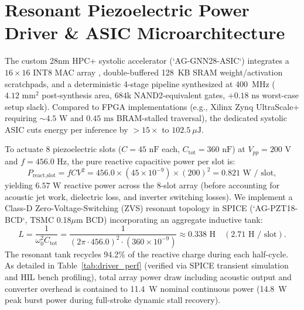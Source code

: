 \documentclass[journal,10pt,twocolumn]{IEEEtran}
\begin{document}
\section{Resonant Piezoelectric Power Driver \& ASIC Microarchitecture}
The custom 28nm HPC+ systolic accelerator (`AG-GNN28-ASIC`) \cite{dixit2025aeroguard} integrates a $16 \times 16$ INT8 MAC array \cite{jouppi2017datacenter,chen2016eyeriss}, double-buffered 128~KB SRAM weight/activation scratchpads, and a deterministic 4-stage pipeline synthesized at 400~MHz ($4.12\text{ mm}^2$ post-synthesis area, $684\text{k}$ NAND2-equivalent gates, $+0.18\text{ ns}$ worst-case setup slack). Compared to FPGA implementations (e.g., Xilinx Zynq UltraScale+ requiring $\sim 4.5\text{ W}$ and $0.45\text{ ms}$ BRAM-stalled traversal), the dedicated systolic ASIC cuts energy per inference by $>15\times$ to $102.5\ \mu\text{J}$.

To actuate 8 piezoelectric slots \cite{cattafesta2011actuators} ($C = 45\text{ nF}$ each, $C_{\text{tot}} = 360\text{ nF}$) at $V_{pp} = 200\text{ V}$ and $f = 456.0\text{ Hz}$, the pure reactive capacitive power per slot is:
\begin{equation}
P_{\text{react,slot}} = f C V^2 = 456.0 \times (45 \times 10^{-9}) \times (200)^2 = 0.821\text{ W / slot},
\end{equation}
yielding $6.57\text{ W}$ reactive power across the 8-slot array (before accounting for acoustic jet work, dielectric loss, and inverter switching losses). We implement a Class-D Zero-Voltage-Switching (ZVS) resonant topology \cite{erickson2007fundamentals} in SPICE (`AG-PZT18-BCD`, TSMC 0.18$\mu$m BCD) incorporating an aggregate inductive tank:
\begin{equation}
L = \frac{1}{\omega_0^2 C_{\text{tot}}} = \frac{1}{(2\pi \cdot 456.0)^2 \cdot (360 \times 10^{-9})} \approx 0.338\text{ H} \quad (2.71\text{ H / slot}).
\end{equation}
The resonant tank recycles 94.2\% of the reactive charge during each half-cycle. As detailed in Table~\ref{tab:driver_perf} (verified via SPICE transient simulation and HIL bench profiling), total array power draw including acoustic output and converter overhead is contained to 11.4~W nominal continuous power (14.8~W peak burst power during full-stroke dynamic stall recovery).
\end{document}
